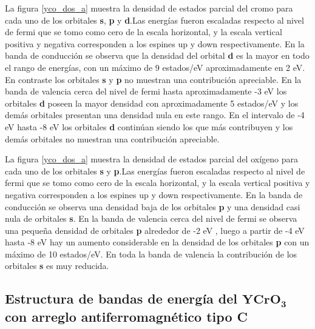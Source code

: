 \noindent La figura \ref{yco_dos_a}  muestra la densidad de 
estados parcial del 
cromo para 
cada 
uno de los orbitales \textbf{s}, \textbf{p} y \textbf{d}.Las 
energ\'ias fueron escaladas 
respecto al 
nivel de fermi que se tomo como cero de la escala horizontal, y la 
escala 
vertical positiva y negativa corresponden a los espines up y down 
respectivamente. En la banda de conducci\'on se observa que la 
densidad del orbital \textbf{d} es la mayor en todo el rango de 
energ\'ias, con un m\'aximo de 9 estados/eV aproximadamente en 2 eV. 
En contraste los orbitales \textbf{s} y \textbf{p} no muestran una 
contribuci\'on apreciable. En la banda de valencia cerca del nivel de 
fermi hasta aproximadamente -3 eV los orbitales \textbf{d} poseen la 
mayor densidad con aproximadamente 5 estados/eV y los dem\'as 
orbitales presentan una densidad nula en este rango. En el intervalo 
de -4 eV hasta -8 eV los orbitales \textbf{d} contin\'uan siendo los 
que m\'as contribuyen y los dem\'as orbitales no muestran una 
contribuci\'on apreciable.


\noindent La figura \ref{yco_dos_a}  muestra la densidad de 
estados parcial del 
ox\'igeno para 
cada 
uno de los orbitales \textbf{s} y \textbf{p}.Las 
energ\'ias fueron escaladas 
respecto al 
nivel de fermi que se tomo como cero de la escala horizontal, y la 
escala 
vertical positiva y negativa corresponden a los espines up y down 
respectivamente. En la banda de conducci\'on se observa una densidad 
baja de los orbitales \textbf{p} y una densidad casi nula de orbitales 
\textbf{s}. En la banda de valencia cerca del nivel de fermi se 
observa una peque\~na densidad de orbitales \textbf{p} alrededor de -2 
eV , luego a partir de -4 eV hasta -8 eV hay un aumento considerable 
en la densidad de los orbitales \textbf{p} con un m\'aximo de 10 
estados/eV. En toda la banda de valencia la contribuci\'on de los 
orbitales \textbf{s} es muy reducida.

\subsection{Estructura de bandas de energ\'ia del $\mathbf{YCrO_{3}}$ con      
    arreglo antiferromagn\'etico tipo C}



